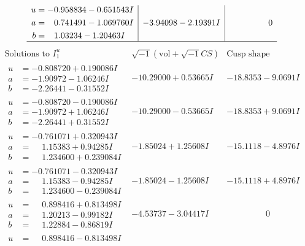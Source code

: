 \documentclass[1p]{elsarticle_modified}
\theoremstyle{definition}
\newcommand{\I}{\sqrt{-1}}
\begin{document}
$$\begin{array}{c|c|c}
\begin{aligned}
u &= -0.958834 - 0.651543 I \\
a &= \phantom{-}0.741491 - 1.069760 I \\
b &= \phantom{-}1.03234 - 1.20463 I\end{aligned}
 & -3.94098 - 2.19391 I & \phantom{-0.000000 } 0\\
 \hline 
 \end{array}$$\newpage$$\begin{array}{c|c|c}  
\text{Solutions to }I^u_{1}& \I (\text{vol} + \sqrt{-1}CS) & \text{Cusp shape}\\
 \hline 
\begin{aligned}
u &= -0.808720 + 0.190086 I \\
a &= -1.90972 - 1.06246 I \\
b &= -2.26441 - 0.31552 I\end{aligned}
 & -10.29000 + 0.53665 I & -18.8353 - 9.0691 I \\ \hline\begin{aligned}
u &= -0.808720 - 0.190086 I \\
a &= -1.90972 + 1.06246 I \\
b &= -2.26441 + 0.31552 I\end{aligned}
 & -10.29000 - 0.53665 I & -18.8353 + 9.0691 I \\ \hline\begin{aligned}
u &= -0.761071 + 0.320943 I \\
a &= \phantom{-}1.15383 + 0.94285 I \\
b &= \phantom{-}1.234600 + 0.239084 I\end{aligned}
 & -1.85024 + 1.25608 I & -15.1118 - 4.8976 I \\ \hline\begin{aligned}
u &= -0.761071 - 0.320943 I \\
a &= \phantom{-}1.15383 - 0.94285 I \\
b &= \phantom{-}1.234600 - 0.239084 I\end{aligned}
 & -1.85024 - 1.25608 I & -15.1118 + 4.8976 I \\ \hline\begin{aligned}
u &= \phantom{-}0.898416 + 0.813498 I \\
a &= \phantom{-}1.20213 - 0.99182 I \\
b &= \phantom{-}1.22884 - 0.86819 I\end{aligned}
 & -4.53737 - 3.04417 I & \phantom{-0.000000 } 0 \\ \hline\begin{aligned}
u &= \phantom{-}0.898416 - 0.813498 I \\

\end{aligned}
\end{array}$$
\end{document}
